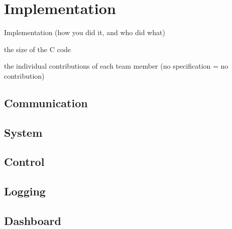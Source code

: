 \documentclass[final]{article}
\begin{document}
\section{Implementation}
\label{sec:implmentation}
Implementation (how you did it, and who did what)

the size of the C code

the individual contributions of each team member (no specification = no contribution)


\subsection{Communication}

\subsection{System}

\subsection{Control}

\subsection{Logging}

\subsection{Dashboard}
\end{document}
